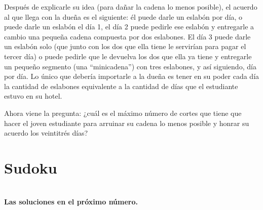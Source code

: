 \begin{multicols}{2}
Después de explicarle su idea (para dañar la cadena lo menos posible),
el acuerdo al que llega con la dueña es el siguiente: él puede darle
un eslabón por día, o puede darle un eslabón el día 1, el día 2 puede
pedirle ese eslabón y entregarle a cambio una pequeña cadena compuesta
por dos eslabones. El día 3 puede darle un eslabón solo (que junto con
los dos que ella tiene le servirían para pagar el tercer día) o puede
pedirle que le devuelva los dos que ella ya tiene y entregarle un
pequeño segmento (una ``minicadena'') con tres eslabones, y así
siguiendo, día por día. Lo único que debería importarle a la dueña es
tener en su poder cada día la cantidad de eslabones equivalente a la
cantidad de días que el estudiante estuvo en su hotel.


Ahora viene la pregunta: ¿cuál es el máximo número de cortes
que tiene que hacer el joven estudiante para arruinar su cadena lo
menos posible y honrar su acuerdo los veintitrés días?
\section*{Sudoku}
\begin{center}
  \\
{\bf Las soluciones en el próximo número.}
\end{center}
\end{multicols}
\newpage




